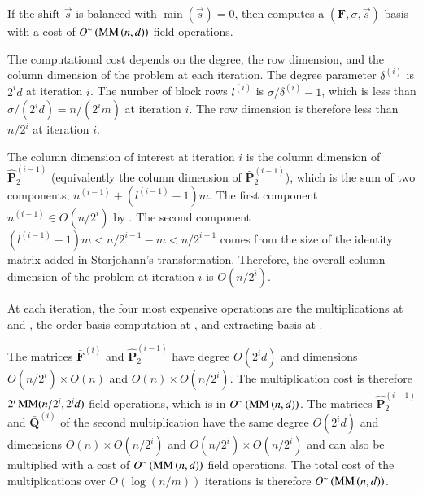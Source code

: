 \begin{thm}
\label{thm:balancedCost}If the shift $\vec{s}$ is balanced with
$\min\left(\vec{s}\right)=0$, then  computes
a $\left(\mathbf{F},\sigma,\vec{s}\right)$-basis with a cost of $O^{\sim}\left(\MM\left(n,d\right)\right)$
field operations.\end{thm}
\begin{pf}
The computational cost depends on the degree, the row dimension, and
the column dimension of the problem at each iteration. The degree
parameter $\delta^{\left(i\right)}$ is $2^{i}d$ at iteration $i$.
The number of block rows $l^{\left(i\right)}$ is $\sigma/\delta^{\left(i\right)}-1$,
which is less than $\sigma/(2^{i}d)=n/(2^{i}m)$ at iteration $i$.
The row dimension is therefore less than $n/2^{i}$ at iteration $i$.

The column dimension of interest at iteration $i$ is the column dimension
of $\hat{\mathbf{P}}_{2}^{\left(i-1\right)}$ (equivalently the column
dimension of $\bar{\mathbf{P}}_{2}^{\left(i-1\right)}$), which is
the sum of two components, $n^{\left(i-1\right)}+(l^{\left(i-1\right)}-1)m$.
The first component $n^{\left(i-1\right)}\in O(n/2^{i})$ by .
The second component $(l^{\left(i-1\right)}-1)m<n/2^{i-1}-m<n/2^{i-1}$
comes from the size of the identity matrix added in Storjohann's transformation.
Therefore, the overall column dimension of the problem at iteration
$i$ is $O(n/2^{i})$.

At each iteration, the four most expensive operations are the multiplications
at  and ,
the order basis computation at ,
and extracting basis at .

The matrices $\bar{\mathbf{F}}^{\left(i\right)}$ and $\hat{\mathbf{P}}_{2}^{\left(i-1\right)}$
have degree $O(2^{i}d)$ and dimensions $O(n/2^{i})\times O\left(n\right)$
and $O\left(n\right)\times O(n/2^{i})$. The multiplication cost is
therefore $2^{i}\MM(n/2^{i},2^{i}d)$ field operations, which is in
$O^{\sim}\left(\MM\left(n,d\right)\right)$. The matrices $\hat{\mathbf{P}}_{2}^{\left(i-1\right)}$
and $\bar{\mathbf{Q}}^{\left(i\right)}$ of the second multiplication
have the same degree $O(2^{i}d)$ and dimensions $O\left(n\right)\times O(n/2^{i})$
and $O(n/2^{i})\times O(n/2^{i})$ and can also be multiplied with
a cost of $O^{\sim}\left(\MM\left(n,d\right)\right)$ field operations.
The total cost of the multiplications over $O(\log\left(n/m\right))$
iterations is therefore $O^{\sim}\left(\MM\left(n,d\right)\right)$.


\end{pf}
